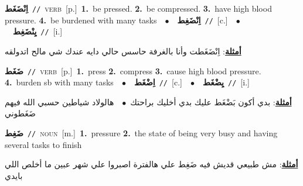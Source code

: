 \documentclass[10pt,a4paper,twoside]{article} %
\begin{document}
\begin{multicols}{2}
{\setlength\topsep{0pt}\textbf{\foreignlanguage{arabic}{اِنْضَغَط}}\ {\color{gray}\texttt{//}\color{black}}\ \textsc{verb}\ [p.]\ \textbf{1.}~be pressed.  \textbf{2.}~be compressed.  \textbf{3.}~have high blood pressure.  \textbf{4.}~be burdened with many tasks\ \ $\bullet$\ \ \setlength\topsep{0pt}\textbf{\foreignlanguage{arabic}{اِنْضَغِط}}\ {\color{gray}\texttt{//}\color{black}}\ [c.]\ \ $\bullet$\ \ \setlength\topsep{0pt}\textbf{\foreignlanguage{arabic}{يِنْضَغِط}}\ {\color{gray}\texttt{//}\color{black}}\ [i.]\  \begin{flushright}\color{gray}\foreignlanguage{arabic}{\textbf{\underline{\foreignlanguage{arabic}{أمثلة}}}: اِنْضَغَطت وأنا بالغرفة حاسس حالي دايه عندك شي مالح اتدولقه}\end{flushright}\color{black}} \vspace{2mm}

{\setlength\topsep{0pt}\textbf{\foreignlanguage{arabic}{ضَغَط}}\ {\color{gray}\texttt{//}\color{black}}\ \textsc{verb}\ [p.]\ \textbf{1.}~press  \textbf{2.}~compress  \textbf{3.}~cause high blood pressure.  \textbf{4.}~burden sb with many tasks\ \ $\bullet$\ \ \setlength\topsep{0pt}\textbf{\foreignlanguage{arabic}{اِضْغَط}}\ {\color{gray}\texttt{//}\color{black}}\ [c.]\ \ $\bullet$\ \ \setlength\topsep{0pt}\textbf{\foreignlanguage{arabic}{يِضْغَط}}\ {\color{gray}\texttt{//}\color{black}}\ [i.]\  \begin{flushright}\color{gray}\foreignlanguage{arabic}{\textbf{\underline{\foreignlanguage{arabic}{أمثلة}}}: بدي أكون بَضْغَط عليك بدي أخليك براحتك\ $\bullet$\ \  هالولاد شياطين حسبي الله فيهم ضَغَطوني}\end{flushright}\color{black}} \vspace{2mm}

{\setlength\topsep{0pt}\textbf{\foreignlanguage{arabic}{ضَغِط}}\ {\color{gray}\texttt{//}\color{black}}\ \textsc{noun}\ [m.]\ \textbf{1.}~pressure  \textbf{2.}~the state of being very busy and having several tasks to finish\  \begin{flushright}\color{gray}\foreignlanguage{arabic}{\textbf{\underline{\foreignlanguage{arabic}{أمثلة}}}: مش طبيعي قديش فيه ضَغِط علي هالفترة اصبروا علي شهر عبين ما أخلص اللي بايدي}\end{flushright}\color{black}} \vspace{2mm}


\end{multicols}
\end{document}
